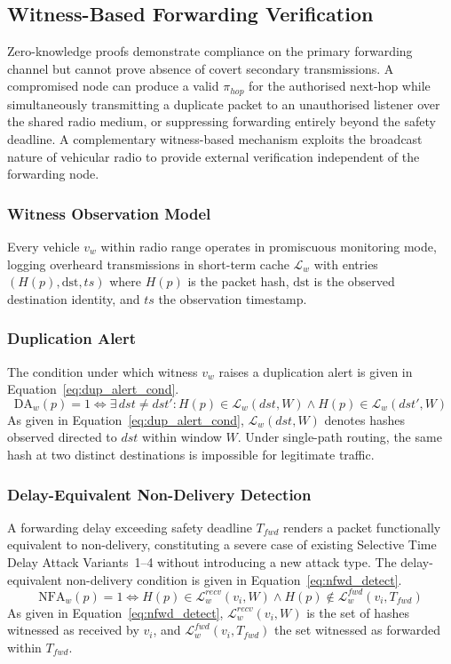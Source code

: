 \documentclass[12pt, a4paper]{report}
\begin{document}
\subsection{Witness-Based Forwarding Verification}
\label{sec:witness}

Zero-knowledge proofs demonstrate compliance on the primary
forwarding channel but cannot prove absence of covert
secondary transmissions. A compromised node can produce a
valid $\pi_{hop}$ for the authorised next-hop while
simultaneously transmitting a duplicate packet to an
unauthorised listener over the shared radio medium, or
suppressing forwarding entirely beyond the safety deadline.
A complementary witness-based mechanism exploits the
broadcast nature of vehicular radio to provide external
verification independent of the forwarding node.

\subsubsection{Witness Observation Model}
Every vehicle $v_w$ within radio range operates in
promiscuous monitoring mode, logging overheard transmissions
in short-term cache $\mathcal{L}_w$ with entries
$(H(p), \text{dst}, ts)$ where $H(p)$ is the packet hash,
$\text{dst}$ is the observed destination identity, and
$ts$ the observation timestamp.


\subsubsection{Duplication Alert}
The condition under which witness $v_w$ raises a duplication
alert is given in Equation~\eqref{eq:dup_alert_cond}.
\begin{equation}
\text{DA}_w(p){=}1\iff
\exists\,dst{\neq}dst':
H(p)\in\mathcal{L}_w(dst,W)
\land H(p)\in\mathcal{L}_w(dst',W)
\label{eq:dup_alert_cond}
\end{equation}
As given in Equation~\eqref{eq:dup_alert_cond},
$\mathcal{L}_w(dst,W)$ denotes hashes observed directed
to $dst$ within window $W$. Under single-path routing,
the same hash at two distinct destinations is impossible
for legitimate traffic.

\subsubsection{Delay-Equivalent Non-Delivery Detection}
A forwarding delay exceeding safety deadline $T_{fwd}$
renders a packet functionally equivalent to non-delivery,
constituting a severe case of existing Selective Time Delay
Attack Variants~1--4 without introducing a new attack type.
The delay-equivalent non-delivery condition is given in
Equation~\eqref{eq:nfwd_detect}.
\begin{equation}
\text{NFA}_w(p){=}1\iff
H(p)\in\mathcal{L}_w^{recv}(v_i,W)
\land H(p)\notin\mathcal{L}_w^{fwd}(v_i,T_{fwd})
\label{eq:nfwd_detect}
\end{equation}
As given in Equation~\eqref{eq:nfwd_detect},
$\mathcal{L}_w^{recv}(v_i,W)$ is the set of hashes
witnessed as received by $v_i$, and
$\mathcal{L}_w^{fwd}(v_i,T_{fwd})$ the set witnessed as
forwarded within $T_{fwd}$.
\end{document}
